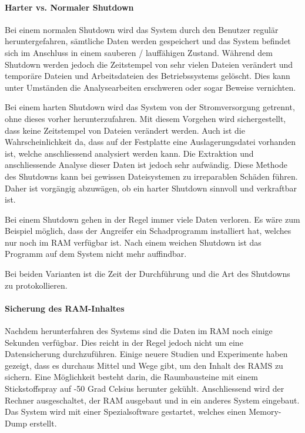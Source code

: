 \paragraph{Harter vs. Normaler Shutdown}
Bei einem normalen Shutdown wird das System durch den Benutzer regulär heruntergefahren, sämtliche Daten werden gespeichert und das System befindet sich im Anschluss in einem sauberen / lauffähigen Zustand. Während dem Shutdown werden jedoch die Zeitstempel von sehr vielen Dateien verändert und temporäre Dateien und Arbeitsdateien des Betriebssystems gelöscht. Dies kann unter Umständen die Analysearbeiten erschweren oder sogar Beweise vernichten. 

Bei einem harten Shutdown wird das System von der Stromversorgung getrennt, ohne dieses vorher herunterzufahren. Mit diesem Vorgehen wird sichergestellt, dass keine Zeitstempel von Dateien verändert werden. Auch ist die Wahrscheinlichkeit da, dass auf der Festplatte eine Auslagerungsdatei vorhanden ist, welche anschliessend analysiert werden kann. Die Extraktion und anschliessende Analyse dieser Daten ist jedoch sehr aufwändig. Diese Methode des Shutdowns kann bei gewissen Dateisystemen zu irreparablen Schäden führen. Daher ist vorgängig abzuwägen, ob ein harter Shutdown sinnvoll und verkraftbar ist.

Bei einem Shutdown gehen in der Regel immer viele Daten verloren. Es wäre zum Beispiel möglich, dass der Angreifer ein Schadprogramm installiert hat, welches nur noch im RAM verfügbar ist. Nach einem weichen Shutdown ist das Programm auf dem System nicht mehr auffindbar. 

Bei beiden Varianten ist die Zeit der Durchführung und die Art des Shutdowns zu protokollieren.

\paragraph{Sicherung des RAM-Inhaltes}
Nachdem herunterfahren des Systems sind die Daten im RAM noch einige Sekunden verfügbar. Dies reicht in der Regel jedoch nicht um eine Datensicherung durchzuführen. Einige neuere Studien und Experimente haben gezeigt, dass es durchaus Mittel und Wege gibt, um den Inhalt des RAMS zu sichern. Eine Möglichkeit besteht darin, die Raumbausteine mit einem Stickstoffspray auf -50 Grad Celsius herunter gekühlt. Anschliessend wird der Rechner ausgeschaltet, der RAM ausgebaut und in ein anderes System eingebaut. Das System wird mit einer Spezialsoftware gestartet, welches einen Memory-Dump erstellt.

